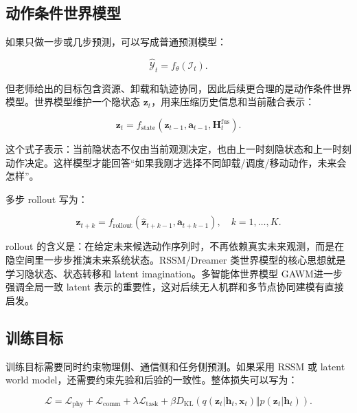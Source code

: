 ﻿\documentclass[UTF8,a4paper,11pt]{ctexart}
\begin{document}
\subsection{动作条件世界模型}

如果只做一步或几步预测，可以写成普通预测模型：

\begin{equation}
\hat{\mathcal{Y}}_t
=
f_{\theta}
\left(
\mathcal{I}_t
\right).
\end{equation}

但老师给出的目标包含资源、卸载和轨迹协同，因此后续更合理的是动作条件世界模型。世界模型维护一个隐状态 $\mathbf{z}_t$，用来压缩历史信息和当前融合表示：

\begin{equation}
\mathbf{z}_{t}
=
f_{\mathrm{state}}
\left(
\mathbf{z}_{t-1},
\mathbf{a}_{t-1},
\mathbf{H}_{t}^{\mathrm{fus}}
\right).
\end{equation}

这个式子表示：当前隐状态不仅由当前观测决定，也由上一时刻隐状态和上一时刻动作决定。这样模型才能回答“如果我刚才选择不同卸载/调度/移动动作，未来会怎样”。

多步 rollout 写为：

\begin{equation}
\hat{\mathbf{z}}_{t+k}
=
f_{\mathrm{rollout}}
\left(
\hat{\mathbf{z}}_{t+k-1},
\mathbf{a}_{t+k-1}
\right),
\quad k=1,\ldots,K.
\end{equation}

rollout 的含义是：在给定未来候选动作序列时，不再依赖真实未来观测，而是在隐空间里一步步推演未来系统状态。RSSM/Dreamer 类世界模型\cite{hafner2020dreamer}的核心思想就是学习隐状态、状态转移和 latent imagination。多智能体世界模型 GAWM\cite{shi2025gawm}进一步强调全局一致 latent 表示的重要性，这对后续无人机群和多节点协同建模有直接启发。

\subsection{训练目标}

训练目标需要同时约束物理侧、通信侧和任务侧预测。如果采用 RSSM 或 latent world model，还需要约束先验和后验的一致性。整体损失可以写为：

\begin{equation}
\mathcal{L}
=
\mathcal{L}_{\mathrm{phy}}
+
\mathcal{L}_{\mathrm{comm}}
+
\lambda \mathcal{L}_{\mathrm{task}}
+
\beta D_{\mathrm{KL}}
\left(
q(\mathbf{z}_t|\mathbf{h}_t,\mathbf{x}_t)
\Vert
p(\mathbf{z}_t|\mathbf{h}_t)
\right).
\end{equation}
\end{document}
